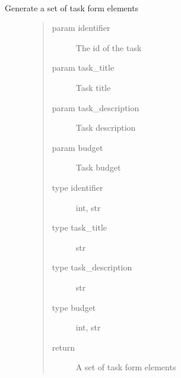 \documentclass[letterpaper,10pt,english]{sphinxmanual}
\begin{document}
\begin{fulllineitems}
\label{\detokenize{index:views.forms.get_task_form_elements}}~\begin{description}
\item[{Generate a set of task form elements}] \leavevmode\begin{quote}\begin{description}
\item[{param identifier}] \leavevmode
The id of the task

\item[{param task\_title}] \leavevmode
Task title

\item[{param task\_description}] \leavevmode
Task description

\item[{param budget}] \leavevmode
Task budget

\item[{type identifier}] \leavevmode
int, str

\item[{type task\_title}] \leavevmode
str

\item[{type task\_description}] \leavevmode
str

\item[{type budget}] \leavevmode
int, str

\item[{return}] \leavevmode
A set of task form elements

\end{description}\end{quote}

\end{description}

\end{fulllineitems}

\end{document}
